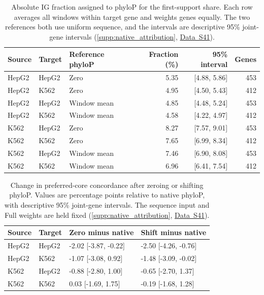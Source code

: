 \documentclass[11pt,a4paper]{article}
\newcommand{\tableid}[1]{\setcounter{table}{\numexpr#1-1\relax}}
\newcommand{\sr}[1]{\ref{#1}}
\newcommand{\data}[1]{\hyperref[data:S#1]{Data~S#1}}
\begin{document}
\tableid{17}
\begin{table}[H]\centering
\caption{Absolute IG fraction assigned to phyloP for the first-support share. Each row averages all windows within target gene and weights genes equally. The two references both use uniform sequence, and the intervals are descriptive 95\% joint-gene intervals (\sr{supp:native_attribution}, \data{41}).}\label{tab:context_ig}\small
\begin{tabular}{@{}lllrrr@{}}\toprule
Source & Target & Reference phyloP & Fraction (\%) & 95\% interval & Genes\\\midrule
HepG2 & HepG2 & Zero & 5.35 & [4.88, 5.86] & 453\\
HepG2 & K562 & Zero & 4.95 & [4.50, 5.43] & 412\\
HepG2 & HepG2 & Window mean & 4.85 & [4.48, 5.24] & 453\\
HepG2 & K562 & Window mean & 4.58 & [4.22, 4.97] & 412\\
K562 & HepG2 & Zero & 8.27 & [7.57, 9.01] & 453\\
K562 & K562 & Zero & 7.65 & [6.99, 8.34] & 412\\
K562 & HepG2 & Window mean & 7.46 & [6.90, 8.08] & 453\\
K562 & K562 & Window mean & 6.96 & [6.41, 7.54] & 412\\
\bottomrule\end{tabular}\end{table}

\tableid{18}
\begin{table}[H]\centering
\caption{Change in preferred-core concordance after zeroing or shifting phyloP. Values are percentage points relative to native phyloP, with descriptive 95\% joint-gene intervals. The sequence input and Full weights are held fixed (\sr{supp:native_attribution}, \data{41}).}\label{tab:context_reliance}\small
\begin{tabular}{@{}llll@{}}\toprule
Source & Target & Zero minus native & Shift minus native\\\midrule
HepG2 & HepG2 & -2.02 [-3.87, -0.22] & -2.50 [-4.26, -0.76]\\
HepG2 & K562 & -1.07 [-3.08, 0.92] & -1.48 [-3.09, -0.02]\\
K562 & HepG2 & -0.88 [-2.80, 1.00] & -0.65 [-2.70, 1.37]\\
K562 & K562 & 0.03 [-1.69, 1.75] & -0.19 [-1.68, 1.28]\\
\bottomrule\end{tabular}\end{table}
\end{document}
